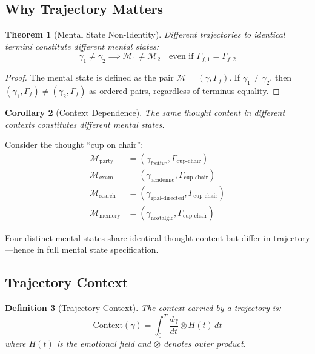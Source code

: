 \documentclass[twocolumn,amsmath,amssymb,aps,prl,superscriptaddress]{revtex4-2}
\newtheorem{theorem}{Theorem}[section]
\newtheorem{corollary}[theorem]{Corollary}
\newtheorem{definition}[theorem]{Definition}
\newcommand{\Mstate}{\mathcal{M}}
\newcommand{\Hfield}{H}
\newcommand{\Gstate}{\Gamma}
\newcommand{\traj}{\gamma}
\begin{document}
\subsection{Why Trajectory Matters}

\begin{theorem}[Mental State Non-Identity]
\label{thm:nonidentity}
Different trajectories to identical termini constitute different mental states:
\begin{equation}
\boxed{\traj_1 \neq \traj_2 \implies \Mstate_1 \neq \Mstate_2 \quad \text{even if } \Gstate_{f,1} = \Gstate_{f,2}}
\end{equation}
\end{theorem}

\begin{proof}
The mental state is defined as the pair $\Mstate = (\traj, \Gstate_f)$. If $\traj_1 \neq \traj_2$, then $(\traj_1, \Gstate_f) \neq (\traj_2, \Gstate_f)$ as ordered pairs, regardless of terminus equality.
\end{proof}

\begin{corollary}[Context Dependence]
The same thought content in different contexts constitutes different mental states.
\end{corollary}

Consider the thought ``cup on chair'':
\begin{align}
\Mstate_{\text{party}} &= (\traj_{\text{festive}}, \Gstate_{\text{cup-chair}}) \\
\Mstate_{\text{exam}} &= (\traj_{\text{academic}}, \Gstate_{\text{cup-chair}}) \\
\Mstate_{\text{search}} &= (\traj_{\text{goal-directed}}, \Gstate_{\text{cup-chair}}) \\
\Mstate_{\text{memory}} &= (\traj_{\text{nostalgic}}, \Gstate_{\text{cup-chair}})
\end{align}

Four distinct mental states share identical thought content but differ in trajectory---hence in full mental state specification.

\subsection{Trajectory Context}

\begin{definition}[Trajectory Context]
The context carried by a trajectory is:
\begin{equation}
\text{Context}(\traj) = \int_0^T \frac{d\traj}{dt} \otimes \Hfield(t) \, dt
\end{equation}
where $\Hfield(t)$ is the emotional field and $\otimes$ denotes outer product.
\end{definition}
\end{document}
